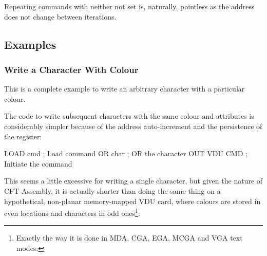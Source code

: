 Repeating commands with neither  not  set is,
naturally, pointless as the address does not change between iterations.


\subsection{Examples}

\subsubsection{Write a Character With Colour}

This is a complete example to write an arbitrary character with a particular
colour.


\noindent The code to write subsequent characters with the same colour and attributes is
considerably simpler because of the address auto-increment and the persistence
of the  register:

\begin{cftasmcode}
         LOAD cmd                    ; Load command
         OR char                     ; OR the character
         OUT VDU CMD                 ; Initiate the command
\end{cftasmcode}

\noindent This seems a little excessive for writing a single character, but given the
nature of CFT Assembly, it is actually shorter than doing the same thing on a
hypothetical, non-planar memory-mapped VDU card, where colours are stored in
even locations and characters in odd ones\footnote{Exactly the way it is done
  in MDA, CGA, EGA, MCGA and VGA text modes.}:

